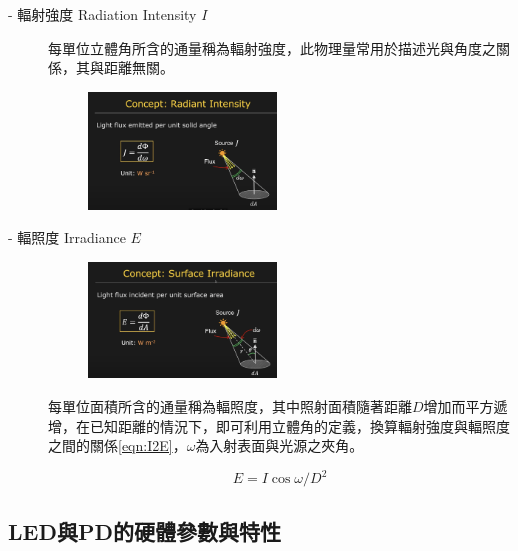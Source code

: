 \begin{description}
            \item[- 輻射強度 Radiation Intensity $I$] \hfill
             
                每單位立體角所含的通量稱為輻射強度，此物理量常用於描述光與角度之關係，其與距離無關。
                \begin{figure}[ht]
                    \centering
                    \includegraphics[width=5cm]{00temppic/4.png}
                \end{figure}

            \item[- 輻照度 Irradiance $E$] \hfill
                \begin{figure}[ht]
                    \centering
                    \includegraphics[width=5cm]{00temppic/5.png}
                \end{figure}
                每單位面積所含的通量稱為輻照度，其中照射面積隨著距離$D$增加而平方遞增，在已知距離的情況下，即可利用立體角的定義，換算輻射強度與輻照度之間的關係\ref{eqn:I2E}，$\omega$為入射表面與光源之夾角。
                
                \begin{equation}
                    \label{eqn:I2E}
                    E=I\cos\omega/D^2
                \end{equation}

                
             
        \end{description}

        

        

    \subsection{LED與PD的硬體參數與特性}

